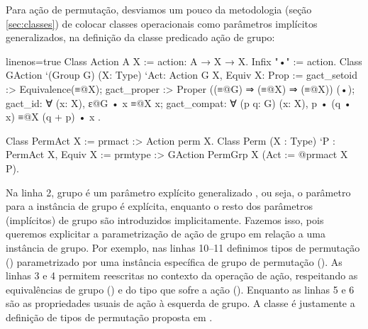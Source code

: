 Para ação de permutação, desviamos um pouco da metodologia (seção \ref{sec:classes}) de colocar classes operacionais como parâmetros implícitos generalizados, na definição da classe predicado ação de grupo:
\begin{coqcode*}{linenos=true}
Class Action A X := action: A → X → X.    Infix "•" := action.
Class GAction `(Group G) (X: Type) `{Act: Action G X, Equiv X}: Prop := {
   gact_setoid :> Equivalence(≡@{X});
   gact_proper :> Proper ((≡@{G}) ⇒ (≡@{X}) ⇒ (≡@{X})) (•);
   gact_id: ∀ (x: X), ɛ@{G} • x ≡@{X} x;
   gact_compat: ∀ (p q: G) (x: X), p • (q • x) ≡@{X} (q + p) • x
}.

Class PermAct X := prmact :> Action perm X.
Class Perm (X : Type) `{P : PermAct X, Equiv X} := 
   prmtype :> GAction PermGrp X (Act := @prmact X P).
\end{coqcode*}
Na linha 2, grupo é um parâmetro explícito generalizado , ou seja, o parâmetro para a instância de grupo é explícita, enquanto o resto dos parâmetros (implícitos) de grupo são introduzidos implicitamente. Fazemos isso, pois queremos explicitar a parametrização de ação de grupo em relação a uma instância de grupo. Por exemplo, nas linhas 10--11 definimos tipos de permutação () parametrizado por uma instância específica de grupo de permutação (). As linhas 3 e 4 permitem reescritas no contexto da operação de ação, respeitando as equivalências de grupo () e do tipo que sofre a ação (). Enquanto as linhas 5 e 6 são as propriedades usuais de ação à esquerda de grupo. A classe  é justamente a definição de tipos de permutação proposta em \cite{Urban2008}.


